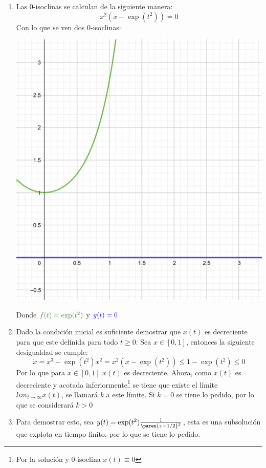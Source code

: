 \documentclass{homework}
\begin{document}
\begin{sol}
    \begin{enumerate}
        \item Las 0-isoclinas se calculan de la siguiente manera:
        \begin{equation*}
            x^2(x-\exp(t^2))=0
        \end{equation*}
        Con lo que se ven dos 0-isoclinas:
        \begin{center}
            \includegraphics{Isoclines.png}
        \end{center}
        Donde \(\textcolor{OliveGreen}{f(t)=\exp(t^2)}\) y \(\textcolor{blue}{g(t)=0}\)
        \item Dado la condición inicial es suficiente demostrar que \(x(t)\) es decreciente para que este definida para todo \(t\geq0\). Sea \(x\in[0,1]\), entonces la siguiente desigualdad se cumple:
        \begin{equation*}
            \dot{x}=x^3-\exp(t^2)x^2=x^2(x-\exp(t^2))\leq1-\exp(t^2)\leq0
        \end{equation*}
        Por lo que para \(x\in[0,1]\) \(x(t)\) es decreciente. Ahora, como \(x(t)\) es decreciente y acotada inferiormente\footnote{Por la solución y 0-isoclina \(x(t)\equiv0\)} se tiene que existe el límite \(lim_{t\rightarrow\infty}x(t)\), se llamará \(k\) a este límite. Si \(k=0\) se tiene lo pedido, por lo que se considerará \(k>0\)
        \item Para demostrar esto, sea \(y(t)=\exp(t^2)\frac1{\paren{x-1/2}^2}\), esta es una subsolución que explota en tiempo finito, por lo que se tiene lo pedido.
    \end{enumerate}
\end{sol}
\end{document}
